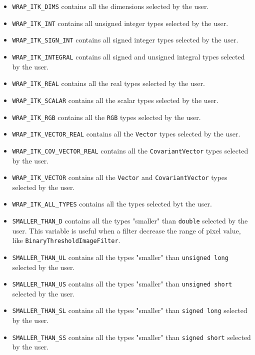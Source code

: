 \documentclass{InsightArticle}
\begin{document}
\begin{itemize}
  \item \verb$WRAP_ITK_DIMS$ contains all the dimensions selected by the user.

  \item \verb$WRAP_ITK_INT$ contains all unsigned integer types selected by the user.

  \item \verb$WRAP_ITK_SIGN_INT$ contains all signed integer types selected by the user.

  \item \verb$WRAP_ITK_INTEGRAL$ contains all signed and unsigned integral types
selected by the user.

  \item \verb$WRAP_ITK_REAL$ contains all the real types selected by the user.

  \item \verb$WRAP_ITK_SCALAR$ contains all the scalar types selected by the user.

  \item \verb$WRAP_ITK_RGB$ contains all the \verb$RGB$ types selected by the user.

  \item \verb$WRAP_ITK_VECTOR_REAL$ contains all the \verb$Vector$ types selected
by the user.

  \item \verb$WRAP_ITK_COV_VECTOR_REAL$ contains all the \verb$CovariantVector$ types selected
by the user.

  \item \verb$WRAP_ITK_VECTOR$ contains all the \verb$Vector$ and 
\verb$CovariantVector$ types selected by the user.

  \item \verb$WRAP_ITK_ALL_TYPES$ contains all the types selected byt the user.

  \item \verb$SMALLER_THAN_D$ contains all the types "smaller" than \verb$double$
selected by the user. This variable is useful when a filter decrease the range
of pixel value, like \verb$BinaryThresholdImageFilter$.

  \item \verb$SMALLER_THAN_UL$ contains all the types "smaller" than \verb$unsigned long$
selected by the user.

  \item \verb$SMALLER_THAN_US$ contains all the types "smaller" than \verb$unsigned short$
selected by the user.

  \item \verb$SMALLER_THAN_SL$ contains all the types "smaller" than \verb$signed long$
selected by the user.

  \item \verb$SMALLER_THAN_SS$ contains all the types "smaller" than \verb$signed short$
selected by the user.

\end{itemize}
\end{document}
